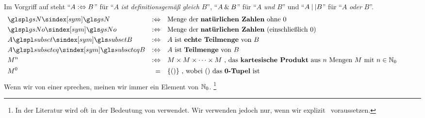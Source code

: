 Im Vorgriff auf  steht \enquote{$A :\Leftrightarrow B$} für \enquote{$A$ \emph{ist definitionsgemäß gleich} $B$}, \enquote{$A \mathbin{\&} B$} für \enquote{$A$ \emph{und} $B$} und \enquote{$A \metaor B$} für \enquote{$A$ \emph{oder} $B$}.
%
\begin{align}
	& \glsSym{gsN}          & \metadefeq & \quad
	\text{Menge der \defn{natürlichen Zahlen}  ohne           $0$} \\
	& \glsSym{gsNo}         & \metadefeq & \quad
	\text{Menge der \defn{natürlichen Zahlen} (einschließlich $0$)} \\
	& A \glsSym{subset} B   & \metadefeq & \quad
	\text{$A$ ist \defn{echte Teilmenge} von $B$}                 \\
	& A \glsSym{subseteq} B & \metadefeq & \quad
	\text{$A$ ist       \defn{Teilmenge} von $B$}                 \\
	& M^n                   & \metadefeq & \quad
	M \times M \times \dots \times M
	\text{ , das \defn{kartesische Produkt} aus $n$ Mengen $M$ mit } n \in \gsNo \\
	& M^0                   & =          & \quad \{()\}
	\text{ , wobei $()$ das \defn{0-Tupel} ist}
	\formulaspace
\end{align}
%
Wenn wir von einer  sprechen, meinen wir immer ein Element von $\mathbb{N}_0$.%
\footnote{%
	In der Literatur wird \chrqt{$\subset$} oft in der Bedeutung von \chrqt{$\subseteq$} verwendet.
	Wir verwenden \chrqt{$\subset$} jedoch nur, wenn wir explizit \Ungleichheit\ voraussetzen.
}

